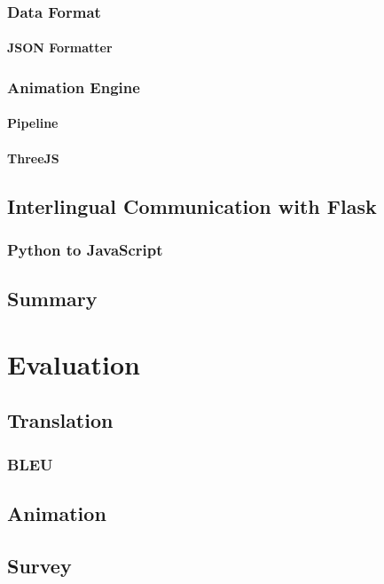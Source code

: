 \documentclass[12pt]{ociamthesis}  %
\begin{document}
	\subsection{Data Format}
		\subsubsection{JSON Formatter}
	\subsection{Animation Engine}
		\subsubsection{Pipeline}
		\subsubsection{ThreeJS}
	
\section{Interlingual Communication with Flask}
	\subsection{Python to JavaScript}

\section{Summary}
			

\chapter{Evaluation}

\section{Translation}
	\subsection{BLEU}
\section{Animation}
\section{Survey}
\end{document}
